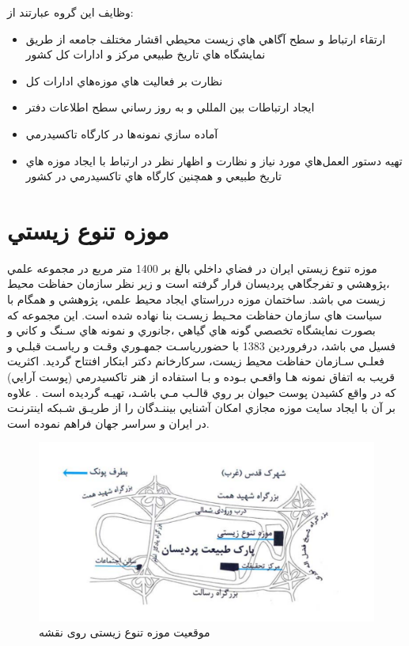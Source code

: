وظایف این گروه عبارتند از:

\begin{itemize}
    \item ارتقاء ارتباط و سطح آگاهي هاي زيست محيطي اقشار مختلف جامعه از طريق نمايشگاه
    هاي تاريخ طبيعي مركز و ادارات كل كشور
    \item نظارت بر فعاليت هاي موزه‌هاي ادارات كل
    \item ايجاد ارتباطات بين المللي و به روز رساني سطح اطلاعات دفتر
    \item آماده سازي نمونه‌ها در كارگاه تاكسيدرمي
    \item تهيه دستور العمل‌هاي مورد نياز و نظارت و اظهار نظر در ارتباط با ايجاد موزه هاي تاريخ
    طبيعي و همچنين كارگاه هاي تاكسيدرمي در كشور
\end{itemize}

\section{موزه تنوع زيستي}
موزه تنوع زيستي ايران در فضاي داخلي بالغ بر 1400 متر مربع در مجموعه علمي ،پژوهشي و تفرجگاهي
پرديسان قرار گرفته است و زير نظر سازمان حفاظت محيط زيست مي باشد. 
ساختمان موزه درراستاي ايجاد محيط علمي، پژوهشي و همگام با سياست هاي سازمان حفاظت محـيط زيسـت
بنا نهاده شده است. اين مجموعه كه بصورت نمايشگاه تخصصي گونه هاي گياهي ،جانوري و نمونه هاي سـنگ و
كاني و فسيل مي باشد، درفروردين 1383 با حضوررياسـت جمهـوري وقـت و رياسـت قبلـي و فعلـي سـازمان
حفاظت محيط زيست، سركارخانم دكتر ابتكار افتتاح گرديد. اكثريت قريب به اتفاق نمونه هـا واقعـي بـوده و بـا
استفاده از هنر تاكسيدرمي (پوست آرايي) كه در واقع كشيدن پوست حيوان بر روي قالـب مـي باشـد، تهيـه
گرديده است . علاوه بر آن با ايجاد سايت موزه مجازي امكان آشنايي بيننـدگان را از طريـق شـبكه اينترنـت در
ايران و سراسر جهان فراهم نموده است.

\begin{figure}
    \label{fig2.1}
    \centering
    \includegraphics[scale = 0.5]{images/map.PNG}
    \caption{موقعیت موزه تنوع زیستی روی نقشه}
\end{figure}

